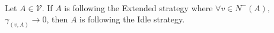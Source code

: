 \begin{lemma} \ \\
  \label{idleextended}
  Let $A \in \mathcal{V}$. If $A$ is following the Extended strategy where $\forall v \in N^{-}\left(A\right),$
  $\gamma_{\left(v, A\right)} \rightarrow 0$, then $A$ is following the Idle strategy.
\end{lemma}
